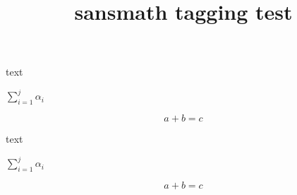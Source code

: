 \documentclass{article}
\title{sansmath tagging test}
\begin{document}
text

$\sum_{i=1}^j\alpha_i$

\[a+b=c\]

\begin{sansmath}
text

$\sum_{i=1}^j\alpha_i$

\[a+b=c\]
\end{sansmath}
\end{document}
